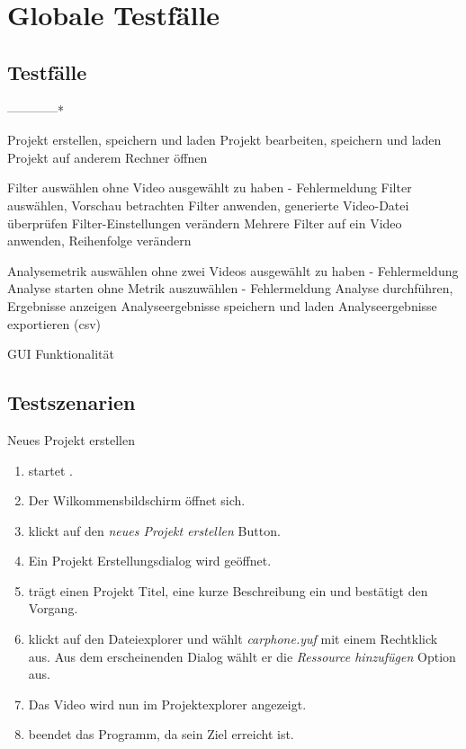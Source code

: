 \chapter{Globale Testfälle}
\section{Testfälle}
\setcounter{counterKriterien}{0}

------------*

 Projekt erstellen, speichern und laden
 Projekt bearbeiten, speichern und laden
 Projekt auf anderem Rechner öffnen

 Filter auswählen ohne Video ausgewählt zu haben - Fehlermeldung
 Filter auswählen, Vorschau betrachten
 Filter anwenden, generierte Video-Datei überprüfen
 Filter-Einstellungen verändern
 Mehrere Filter auf ein Video anwenden, Reihenfolge verändern

 Analysemetrik auswählen ohne zwei Videos ausgewählt zu haben - Fehlermeldung
 Analyse starten ohne Metrik auszuwählen - Fehlermeldung
 Analyse durchführen, Ergebnisse anzeigen
 Analyseergebnisse speichern und laden
 Analyseergebnisse exportieren (csv)

 GUI Funktionalität




\section{Testszenarien}
\setcounter{counterKriterien}{0}


 Neues Projekt erstellen\\
\begin{enumerate}
\item \dAU startet \projektTitel.
\item Der Wilkommensbildschirm öffnet sich.
\item \dAU klickt auf den \emph{neues Projekt erstellen} Button.
\item Ein Projekt Erstellungsdialog wird geöffnet.
\item \dAU trägt einen Projekt Titel, eine kurze Beschreibung ein und bestätigt den Vorgang.
\item \dAU klickt auf den Dateiexplorer und wählt \emph{carphone.yuf} mit einem Rechtklick aus. Aus dem erscheinenden Dialog wählt er die \emph{Ressource hinzufügen} Option aus.
\item Das Video wird nun im Projektexplorer angezeigt.
\item \dAU beendet das Programm, da sein Ziel erreicht ist.
\end{enumerate}


